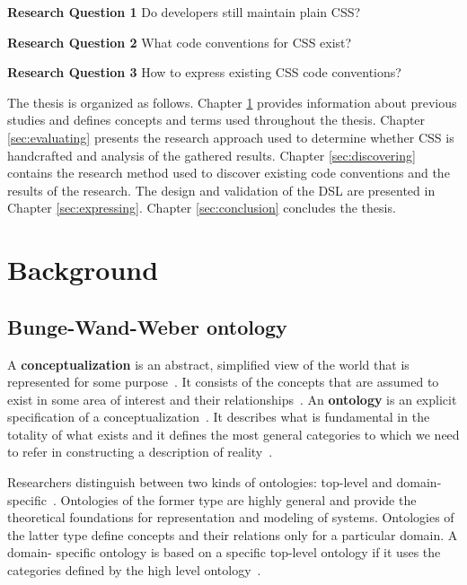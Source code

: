 \documentclass[parskip=full]{uvamscse}
\begin{document}
  \begin{description}
    \item \textbf{Research Question 1} Do developers still maintain plain CSS?
    \item \textbf{Research Question 2} What code conventions for CSS exist?
    \item \textbf{Research Question 3} How to express existing CSS code conventions?
  \end{description}

The thesis is organized as follows. Chapter \ref{sec:background} provides information about previous
studies and defines concepts and terms used throughout the thesis. Chapter \ref{sec:evaluating}
presents the research approach used to determine whether CSS is handcrafted and analysis of the
gathered results. Chapter \ref{sec:discovering} contains the research method  used to discover
existing code conventions and the results of the research. The design and validation of the DSL are
presented in Chapter \ref{sec:expressing}. Chapter \ref{sec:conclusion} concludes the thesis.


\chapter{Background}
\label{sec:background}

\section{Bunge-Wand-Weber ontology}

A \textbf{conceptualization} is an abstract, simplified view of the world that is represented for
some purpose~\cite{gruber1995toward}. It consists of the concepts that are assumed to exist in some
area of interest and their relationships~\cite{gruber1995toward}. An \textbf{ontology} is an
explicit specification of a conceptualization~\cite{gruber1995toward}. It describes what is
fundamental in the totality of what exists and it defines the most general categories to which we
need to refer in constructing a description of reality~\cite{milton2004top}.

Researchers distinguish between two kinds of ontologies: top-level and domain-
specific~\cite{milton2004top}. Ontologies of the former type are highly general and provide the
theoretical foundations for representation and modeling of systems. Ontologies of the latter type
define concepts and their relations only for a particular domain. A domain- specific ontology is
based on a specific top-level ontology if it uses the categories defined by the high level
ontology~\cite{milton2004top}.
\end{document}
